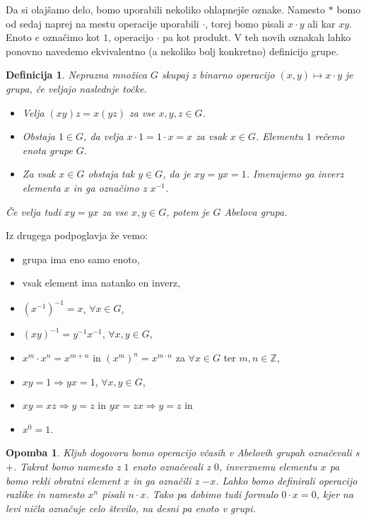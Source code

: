 \documentclass[10pt, a4paper]{article}
\newtheorem{defi}{Definicija}[section]
\newenvironment{noticeB}{%
  \tcolorbox[%
  notitle,
  empty,
  enhanced,  %
  breakable,
  coltext=black,
  colback=white, 
  fontupper=\rmfamily,
  parbox=false,
  noparskip,
  sharp corners,
  boxrule=-1pt,  %
  frame hidden,
  left=7pt,  %
  right=7pt,
  top=5pt,
  bottom=5pt,
  before skip=2.5ex plus 2pt,
  after skip=2.5ex plus 2pt,
  borderline west = {1.5pt}{-0.1pt}{blue!30!black}, %
  overlay unbroken and last={%
    \draw[color=black, line width=1.25pt]
    ($(frame.south west)+(1.pt, -0.1pt)$) -- ++(2em, 0);
  }
  ]}
{\endtcolorbox}
\newenvironment{definicija}{\begin{defi}\begin{noticeB}}{%
    \end{noticeB}\end{defi}}
\newtheorem*{opomba}{Opomba}
\newcommand{\Z}{\mathbb {Z}}
\begin{document}
Da si olajšamo delo, bomo uporabili nekoliko ohlapnejše oznake.
Namesto $*$ bomo od sedaj naprej na mestu operacije uporabili $\cdot$, 
torej bomo pisali $x \cdot y$ ali kar $xy$.
Enoto $e$ označimo kot $1$, operacijo $\cdot$ pa kot produkt.
V teh novih oznakah lahko ponovno navedemo ekvivalentno (a nekoliko bolj konkretno)
definicijo grupe.

\begin{definicija}
  Neprazna množica $G$ skupaj z binarno operacijo $(x, y) \mapsto x \cdot y$ je grupa, če veljajo naslednje točke.
  \begin{itemize}
    \item Velja $(xy)z = x(yz)$ za vse $x, y, z \in G$.
    \item Obstaja $1 \in G$, da velja $x \cdot 1 = 1 \cdot x = x$ za vsak $x \in G$. Elementu $1$ rečemo enota grupe $G$.
    \item Za vsak $x \in G$ obstaja tak $y \in G$, da je $xy = yx = 1$. Imenujemo ga inverz elementa $x$ in ga označimo z $x^{-1}$.
  \end{itemize}
  Če velja tudi $xy = yx$ za vse $x, y \in G$, potem je $G$ Abelova grupa.
\end{definicija}

Iz drugega podpoglavja že vemo:
\begin{itemize}
  \item grupa ima eno samo enoto,
  \item vsak element ima natanko en inverz,
  \item $(x^{-1})^{-1} = x$, $\forall x \in G$,
  \item $(xy)^{-1} = y^{-1}x^{-1}$, $\forall x, y \in G$,
  \item $x^m \cdot x^n = x^{m + n}$ in $(x^m)^n = x^{m \cdot n}$ za $\forall x \in G$ ter $m, n \in \Z$,
  \item $xy = 1 \Rightarrow yx = 1$, $\forall x, y \in G$, 
  \item $xy = xz \Rightarrow y = z$ in $yx = zx \Rightarrow y = z$ in 
  \item $x^0 = 1$.
\end{itemize}

\begin{opomba}
  Kljub dogovoru bomo operacijo včasih v Abelovih grupah označevali s $+$.
  Takrat bomo namesto z $1$ enoto označevali z $0$,
  inverznemu elementu $x$ pa bomo rekli obratni element $x$ in ga označili z $-x$.
  Lahko bomo definirali operacijo razlike in namesto $x^n$ pisali $n \cdot x$.
  Tako pa dobimo tudi formulo $0 \cdot x = 0$, kjer na levi ničla označuje celo število, na desni pa enoto v grupi. 
\end{opomba}
\end{document}
